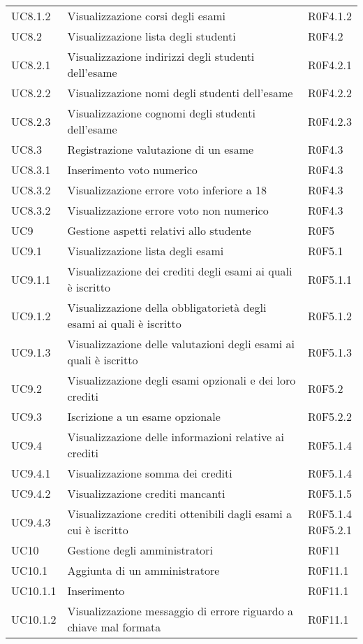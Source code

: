 \documentclass[AnalisiDeiRequisiti.tex]{subfiles}
\begin{document}
\begin{longtable}[H]{p{2cm}p{5cm}p{5cm}}
	UC8.1.2 & Visualizzazione corsi degli esami & R0F4.1.2 \\
	UC8.2 & Visualizzazione lista degli studenti & R0F4.2  \\
	UC8.2.1 & Visualizzazione indirizzi degli studenti dell'esame & R0F4.2.1 \\
	UC8.2.2 & Visualizzazione nomi degli studenti dell'esame & R0F4.2.2 \\
	UC8.2.3 & Visualizzazione cognomi degli studenti dell'esame & R0F4.2.3 \\
	UC8.3 & Registrazione valutazione di un esame & R0F4.3 \\
	UC8.3.1 & Inserimento voto numerico & R0F4.3 \\
	UC8.3.2 & Visualizzazione errore voto inferiore a 18 & R0F4.3 \\
	UC8.3.2 & Visualizzazione errore voto non numerico & R0F4.3 \\
	UC9 & Gestione aspetti relativi allo studente & R0F5 \\
	UC9.1 & Visualizzazione lista degli esami & R0F5.1 \\
	UC9.1.1 & Visualizzazione dei crediti degli esami ai quali è iscritto & R0F5.1.1 \\
	UC9.1.2 & Visualizzazione della obbligatorietà degli esami ai quali è iscritto & R0F5.1.2 \\
	UC9.1.3 & Visualizzazione delle valutazioni degli esami ai quali è iscritto	& R0F5.1.3 \\
	UC9.2 & Visualizzazione degli esami opzionali e dei loro crediti & R0F5.2 \\
	UC9.3 & Iscrizione a un esame opzionale & R0F5.2.2 \\
	UC9.4 & Visualizzazione delle informazioni relative ai crediti & R0F5.1.4 \\ 
	UC9.4.1 & Visualizzazione somma dei crediti & R0F5.1.4 \\ 
	UC9.4.2 & Visualizzazione crediti mancanti & R0F5.1.5 \\ 
	UC9.4.3 & Visualizzazione crediti ottenibili dagli esami a cui è iscritto &  \makecell[tl]{
		R0F5.1.4 \\ 
		R0F5.2.1 } \\
	UC10 & Gestione degli amministratori & R0F11 \\
	UC10.1 & Aggiunta di un amministratore & R0F11.1 \\
	UC10.1.1 & Inserimento \citGloss{chiave pubblica} & R0F11.1 \\
	UC10.1.2 & Visualizzazione messaggio di errore riguardo a chiave mal formata & R0F11.1 \\

\end{longtable}
\end{document}
